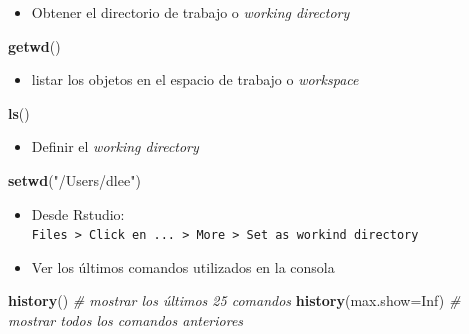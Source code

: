 \documentclass[]{book}
\newenvironment{Shaded}{\begin{snugshade}}{\end{snugshade}}
\newcommand{\KeywordTok}[1]{\textcolor[rgb]{0.13,0.29,0.53}{\textbf{#1}}}
\newcommand{\DataTypeTok}[1]{\textcolor[rgb]{0.13,0.29,0.53}{#1}}
\newcommand{\StringTok}[1]{\textcolor[rgb]{0.31,0.60,0.02}{#1}}
\newcommand{\CommentTok}[1]{\textcolor[rgb]{0.56,0.35,0.01}{\textit{#1}}}
\newcommand{\OtherTok}[1]{\textcolor[rgb]{0.56,0.35,0.01}{#1}}
\newcommand{\NormalTok}[1]{#1}
\providecommand{\tightlist}{%
  \setlength{\itemsep}{0pt}\setlength{\parskip}{0pt}}
\begin{document}
\begin{itemize}
\tightlist
\item
  Obtener el directorio de trabajo o \emph{working directory}
\end{itemize}

\begin{Shaded}
\begin{Highlighting}[]
\KeywordTok{getwd}\NormalTok{() }
\end{Highlighting}
\end{Shaded}

\begin{itemize}
\tightlist
\item
  listar los objetos en el espacio de trabajo o \emph{workspace}
\end{itemize}

\begin{Shaded}
\begin{Highlighting}[]
\KeywordTok{ls}\NormalTok{()}
\end{Highlighting}
\end{Shaded}

\begin{itemize}
\tightlist
\item
  Definir el \emph{working directory}
\end{itemize}

\begin{Shaded}
\begin{Highlighting}[]
\KeywordTok{setwd}\NormalTok{(}\StringTok{"/Users/dlee"}\NormalTok{) }
\end{Highlighting}
\end{Shaded}

\begin{itemize}
\item
  Desde Rstudio:
  \texttt{Files\ \textgreater{}\ Click\ en\ ...\ \textgreater{}\ More\ \textgreater{}\ Set\ as\ workind\ directory}
\item
  Ver los últimos comandos utilizados en la consola
\end{itemize}

\begin{Shaded}
\begin{Highlighting}[]
\KeywordTok{history}\NormalTok{() }\CommentTok{# mostrar los últimos 25 comandos}
\KeywordTok{history}\NormalTok{(}\DataTypeTok{max.show=}\OtherTok{Inf}\NormalTok{) }\CommentTok{# mostrar todos los comandos anteriores}
\end{Highlighting}
\end{Shaded}
\end{document}
